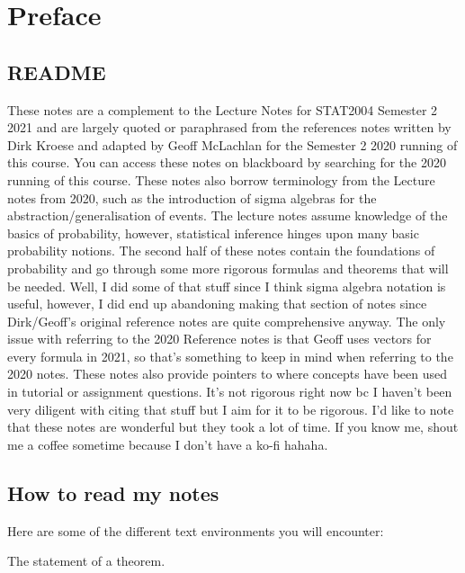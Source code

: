 \chapter*{Preface}

\section*{README}

These notes are a complement to the Lecture Notes for STAT2004 
Semester 2 2021 and are largely quoted or paraphrased from 
the references notes written by Dirk Kroese and adapted by Geoff McLachlan 
for the Semester 2 2020 running of this course. 
You can access these notes on blackboard by searching for the 2020 running of this course. 
These notes also borrow terminology from the Lecture notes from 2020, such as the introduction of 
sigma algebras for the abstraction/generalisation of events.
\bigskip
The lecture notes assume knowledge of the basics of probability, 
however, statistical inference hinges upon many basic 
probability notions. The second half of these notes contain the foundations 
of probability and go through some more rigorous formulas 
and theorems that will be needed. 
Well, I did some of that stuff since I think sigma algebra notation is useful, however, 
I did end up abandoning making that section of notes 
since Dirk/Geoff's original reference notes are quite comprehensive anyway. 
The only issue with referring to the 2020 Reference notes is that Geoff uses vectors for every formula in 2021, so that's something to keep in mind when referring to the 2020 notes. 
\bigskip
These notes also provide pointers to where concepts have been used in tutorial or assignment questions. 
It's not rigorous right now bc I haven't been very diligent with citing that stuff but I aim for it to be rigorous. 
\bigskip
I'd like to note that these notes are wonderful but they 
took a lot of time. 
If you know me, shout me a coffee sometime because I don't have a ko-fi hahaha. 

\section*{How to read my notes}

Here are some of the different text environments you will encounter:
\begin{theorem}\label{thm:}
    The statement of a theorem. 
\end{theorem}

